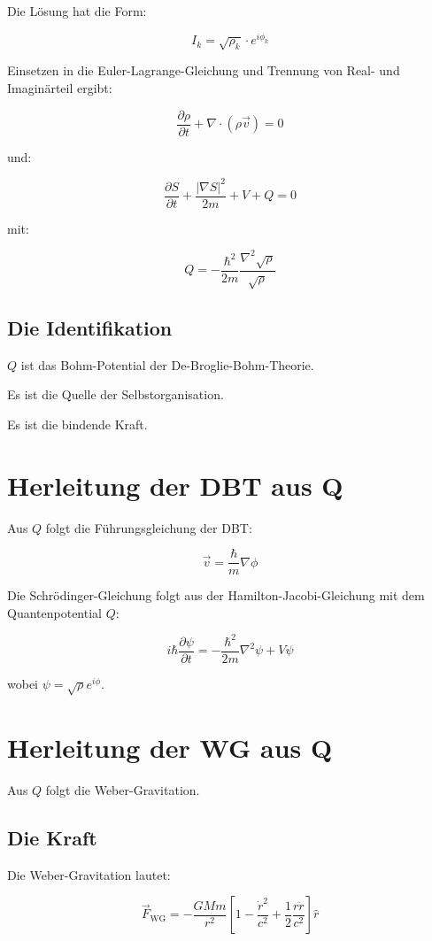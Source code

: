 Die Lösung hat die Form:

\[
I_k = \sqrt{\rho_k} \cdot e^{i \phi_k}
\]

Einsetzen in die Euler-Lagrange-Gleichung und Trennung von Real- und Imaginärteil ergibt:

\[
\frac{\partial \rho}{\partial t} + \nabla \cdot (\rho \vec{v}) = 0
\]

und:

\[
\frac{\partial S}{\partial t} + \frac{|\nabla S|^2}{2m} + V + Q = 0
\]

mit:

\[
Q = -\frac{\hbar^2}{2m} \frac{\nabla^2 \sqrt{\rho}}{\sqrt{\rho}}
\]

\subsection{Die Identifikation}

\( Q \) ist das Bohm-Potential der De-Broglie-Bohm-Theorie.

Es ist die Quelle der Selbstorganisation.

Es ist die bindende Kraft.

\section{Herleitung der DBT aus Q}

Aus \( Q \) folgt die Führungsgleichung der DBT:

\[
\vec{v} = \frac{\hbar}{m} \nabla \phi
\]

Die Schrödinger-Gleichung folgt aus der Hamilton-Jacobi-Gleichung mit dem Quantenpotential \( Q \):

\[
i\hbar \frac{\partial \psi}{\partial t} = -\frac{\hbar^2}{2m} \nabla^2 \psi + V \psi
\]

wobei \( \psi = \sqrt{\rho} e^{i\phi} \).

\section{Herleitung der WG aus Q}

Aus \( Q \) folgt die Weber-Gravitation.

\subsection{Die Kraft}

Die Weber-Gravitation lautet:

\[
\vec{F}_{\text{WG}} = -\frac{GMm}{r^2} \left[ 1 - \frac{\dot{r}^2}{c^2} + \frac{1}{2} \frac{r\ddot{r}}{c^2} \right] \hat{r}
\]

